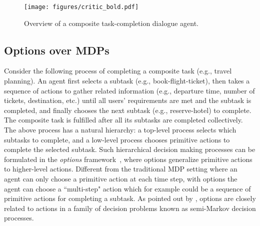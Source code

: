 \documentclass[11pt,letterpaper]{article}
\begin{document}
\begin{figure}[htb]
\centering
\texttt{[image: figures/critic\_bold.pdf]}
\vspace{-3mm}
\caption{Overview of a composite task-completion dialogue agent.}
\label{fig:critic}
\end{figure}

\subsection{Options over MDPs}

Consider the following process of completing a composite task (e.g., travel planning). An agent first selects a subtask (e.g., book-flight-ticket), then takes a sequence of actions to gather related information (e.g., departure time, number of tickets, destination, etc.) until all users' requirements are met and the subtask is completed, and finally chooses the next subtask (e.g., reserve-hotel) to complete. The composite task is fulfilled after all its subtasks are completed collectively. The above process has a natural hierarchy: a top-level process selects which subtasks to complete, and a low-level process chooses primitive actions to complete the selected subtask. Such hierarchical decision making processes can be formulated in the \emph{options} framework~\cite{DBLP:journals/ai/SuttonPS99}, where options generalize primitive actions to higher-level actions.  Different from the traditional MDP setting where an agent can only choose a primitive action at each time step, with options the agent can choose a ``multi-step" action which for example could be a sequence of primitive actions for completing a subtask. As pointed out by , options are closely related to actions in a family of decision problems known as semi-Markov decision processes.
\end{document}
